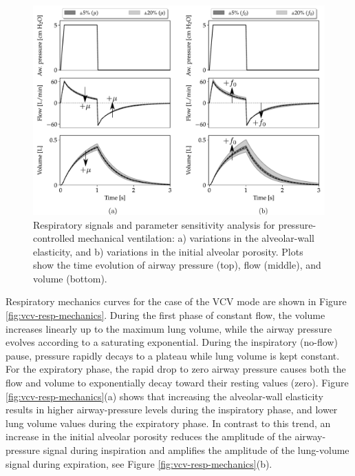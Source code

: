 \documentclass[preprint,3p,12pt,number,sort&compress]{elsarticle}
\begin{document}
\begin{figure}[h!]
    \begin{center}
    \includegraphics[width=1 \textwidth]{./Figures/SA_pcv.pdf}
    \caption[]{Respiratory signals and parameter sensitivity analysis for pressure-controlled mechanical ventilation: a) variations in the alveolar-wall elasticity, and b) variations in the initial alveolar porosity.  Plots show the time evolution of airway pressure (top), flow (middle), and volume (bottom).}
    \label{fig:pcv-resp-mechanics}
    \end{center}
\end{figure}

Respiratory mechanics curves for the case of the VCV mode are shown in Figure \ref{fig:vcv-resp-mechanics}. During the first phase of constant flow, the volume increases linearly up to the maximum lung volume, while the airway pressure evolves according to a saturating exponential. During the inspiratory (no-flow) pause, pressure rapidly decays to a plateau while lung volume is kept constant. For the expiratory phase, the rapid drop to zero airway pressure causes both the flow and volume to exponentially decay toward their resting values (zero). Figure \ref{fig:vcv-resp-mechanics}(a) shows that increasing the alveolar-wall elasticity results in higher airway-pressure levels during the inspiratory phase, and lower lung volume values during the expiratory phase. In contrast to this trend, an increase in the initial alveolar porosity reduces the amplitude of the airway-pressure signal during inspiration and amplifies the amplitude of the lung-volume signal during expiration, see Figure \ref{fig:vcv-resp-mechanics}(b).      
\end{document}
